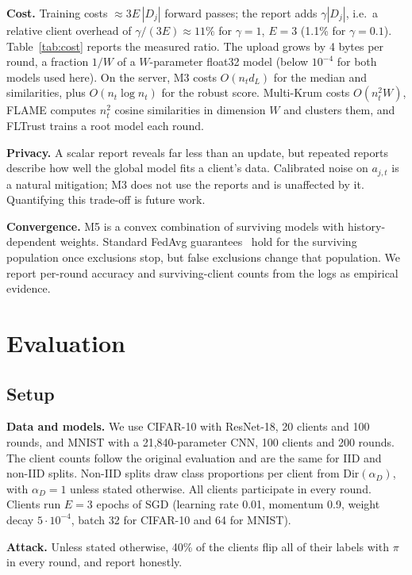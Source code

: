 \documentclass[conference]{IEEEtran}
\begin{document}
\textbf{Cost.} Training costs $\approx 3E\,|D_j|$ forward passes; the report adds $\gamma|D_j|$, i.e.\ a relative client overhead of $\gamma/(3E)\approx 11\%$ for $\gamma=1$, $E=3$ (1.1\% for $\gamma=0.1$). Table~\ref{tab:cost} reports the measured ratio. The upload grows by 4 bytes per round, a fraction $1/W$ of a $W$-parameter float32 model (below $10^{-4}$ for both models used here). On the server, M3 costs $O(n_t d_L)$ for the median and similarities, plus $O(n_t\log n_t)$ for the robust score. Multi-Krum costs $O(n_t^2 W)$, FLAME computes $n_t^2$ cosine similarities in dimension $W$ and clusters them, and FLTrust trains a root model each round.

\textbf{Privacy.} A scalar report reveals far less than an update, but repeated reports describe how well the global model fits a client's data. Calibrated noise on $a_{j,t}$ is a natural mitigation; M3 does not use the reports and is unaffected by it. Quantifying this trade-off is future work.

\textbf{Convergence.} M5 is a convex combination of surviving models with history-dependent weights. Standard FedAvg guarantees~\cite{li2020convergence} hold for the surviving population once exclusions stop, but false exclusions change that population. We report per-round accuracy and surviving-client counts from the logs as empirical evidence.

\section{Evaluation}
\label{sec:eval}
\subsection{Setup}
\textbf{Data and models.} We use CIFAR-10 with ResNet-18, 20 clients and 100 rounds, and MNIST with a 21{,}840-parameter CNN, 100 clients and 200 rounds. The client counts follow the original evaluation and are the same for IID and non-IID splits. Non-IID splits draw class proportions per client from $\mathrm{Dir}(\alpha_D)$, with $\alpha_D=1$ unless stated otherwise. All clients participate in every round. Clients run $E=3$ epochs of SGD (learning rate 0.01, momentum 0.9, weight decay $5\cdot10^{-4}$, batch 32 for CIFAR-10 and 64 for MNIST).

\textbf{Attack.} Unless stated otherwise, 40\% of the clients flip all of their labels with $\pi$ in every round, and report honestly.
\end{document}
